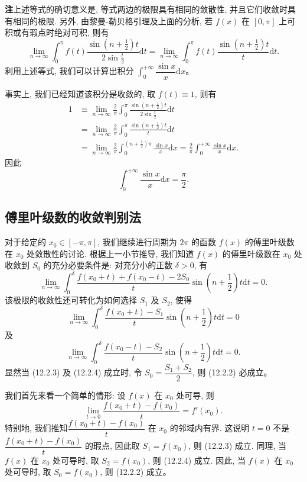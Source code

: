 \documentclass[UTF8, 12pt, fontset=fandol, oneside]{ctexart}
\begin{document}
\noindent\textbf{注}\quad 上述等式的确切意义是, 等式两边的极限具有相同的敛散性, 并且它们收敛时具有相同的极限. 另外, 由黎曼-勒贝格引理及上面的分析, 若 $f(x)$ 在 $[0,\pi]$ 上可积或有瑕点时绝对可积, 则有
\[
  \lim_{n\to\infty}\int_0^\pi f(t)\frac{\sin\left(n+\frac12\right)t}{2\sin\frac t2}\mathrm dt
  =
  \lim_{n\to\infty}\int_0^\pi f(t)\frac{\sin\left(n+\frac12\right)t}{t}\mathrm dt.
\]
利用上述等式, 我们可以计算出积分 $\int_0^{+\infty}\dfrac{\sin x}{x}\mathrm dx$。

事实上, 我们已经知道该积分是收敛的, 取 $f(t)\equiv1$, 则有
\[
\begin{aligned}
  1
  &\equiv\lim_{n\to\infty}\frac2\pi\int_0^\pi
    \frac{\sin\left(n+\frac12\right)t}{2\sin\frac t2}\mathrm dt\\
  &=\lim_{n\to\infty}\frac2\pi\int_0^\pi
    \frac{\sin\left(n+\frac12\right)t}{t}\mathrm dt\\
  &=\lim_{n\to\infty}\frac2\pi\int_0^{(n+\frac12)\pi}\frac{\sin x}{x}\mathrm dx
  =\frac2\pi\int_0^{+\infty}\frac{\sin x}{x}\mathrm dx.
\end{aligned}
\]
因此
\[
  \int_0^{+\infty}\frac{\sin x}{x}\mathrm dx=\frac{\pi}{2}.
\]

\subsection{傅里叶级数的收敛判别法}

对于给定的 $x_0\in[-\pi,\pi]$, 我们继续进行周期为 $2\pi$ 的函数 $f(x)$ 的傅里叶级数在 $x_0$ 处敛散性的讨论. 根据上一小节推导, 我们知道 $f(x)$ 的傅里叶级数在 $x_0$ 处收敛到 $S_0$ 的充分必要条件是: 对充分小的正数 $\delta>0$, 有
\begin{equation}
  \lim_{n\to\infty}\int_0^\delta
  \frac{f(x_0+t)+f(x_0-t)-2S_0}{t}
  \sin\left(n+\frac12\right)t\mathrm dt=0.
  \tag{12.2.2}
\end{equation}
该极限的收敛性还可转化为如何选择 $S_1$ 及 $S_2$, 使得
\begin{equation}
  \lim_{n\to\infty}\int_0^\delta
  \frac{f(x_0+t)-S_1}{t}\sin\left(n+\frac12\right)t\mathrm dt=0
  \tag{12.2.3}
\end{equation}
及
\begin{equation}
  \lim_{n\to\infty}\int_0^\delta
  \frac{f(x_0-t)-S_2}{t}\sin\left(n+\frac12\right)t\mathrm dt=0.
  \tag{12.2.4}
\end{equation}
显然当 (12.2.3) 及 (12.2.4) 成立时, 令 $S_0=\dfrac{S_1+S_2}{2}$, 则 (12.2.2) 必成立。

我们首先来看一个简单的情形: 设 $f(x)$ 在 $x_0$ 处可导, 则
\[
  \lim_{t\to0}\frac{f(x_0+t)-f(x_0)}{t}=f'(x_0).
\]
特别地, 我们推知\allowbreak $\dfrac{f(x_0+t)-f(x_0)}{t}$ 在 $x_0$ 的邻域内有界. 这说明 $t=0$ 不是 $\dfrac{f(x_0+t)-f(x_0)}{t}$ 的瑕点, 因此取 $S_1=f(x_0)$, 则 (12.2.3) 成立. 同理, 当 $f(x)$ 在 $x_0$ 处可导时, 取 $S_2=f(x_0)$, 则 (12.2.4) 成立. 因此, 当 $f(x)$ 在 $x_0$ 处可导时, 取 $S_0=f(x_0)$, 则 (12.2.2) 成立。
\end{document}
